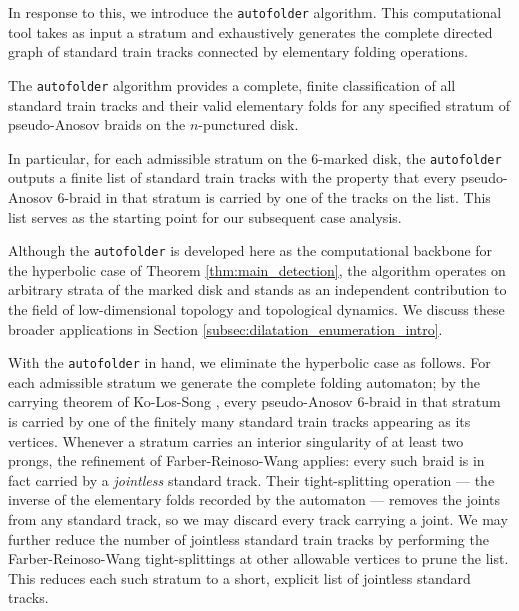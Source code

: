 In response to this, we introduce the \texttt{autofolder} algorithm. This computational tool takes as input a stratum and exhaustively generates the complete directed graph of standard train tracks connected by elementary folding operations.

\begin{theorem}\label{thm:autofolder_main}
The \texttt{autofolder} algorithm provides a complete, finite classification of all standard train tracks and their valid elementary folds for any specified stratum of pseudo-Anosov braids on the $n$-punctured disk.
\end{theorem}

In particular, for each admissible stratum on the 6-marked disk, the \texttt{autofolder} outputs a finite list of standard train tracks with the property that every pseudo-Anosov 6-braid in that stratum is carried by one of the tracks on the list. This list serves as the starting point for our subsequent case analysis.

Although the \texttt{autofolder} is developed here as the computational backbone for the hyperbolic case of Theorem \ref{thm:main_detection}, the algorithm operates on arbitrary strata of the marked disk and stands as an independent contribution to the field of low-dimensional topology and topological dynamics. We discuss these broader applications in Section \ref{subsec:dilatation_enumeration_intro}.

With the \texttt{autofolder} in hand, we eliminate the hyperbolic case as follows. For each admissible stratum we generate the complete folding automaton; by the carrying theorem of Ko-Los-Song \cite{SongEntropy}, every pseudo-Anosov 6-braid in that stratum is carried by one of the finitely many standard train tracks appearing as its vertices. Whenever a stratum carries an interior singularity of at least two prongs, the refinement of Farber-Reinoso-Wang \cite{farber2024fixed} applies: every such braid is in fact carried by a \emph{jointless} standard track. Their tight-splitting operation --- the inverse of the elementary folds recorded by the automaton --- removes the joints from any standard track, so we may discard every track carrying a joint. We may further reduce the number of jointless standard train tracks by performing the Farber-Reinoso-Wang tight-splittings at other allowable vertices to prune the list. This reduces each such stratum to a short, explicit list of jointless standard tracks.

